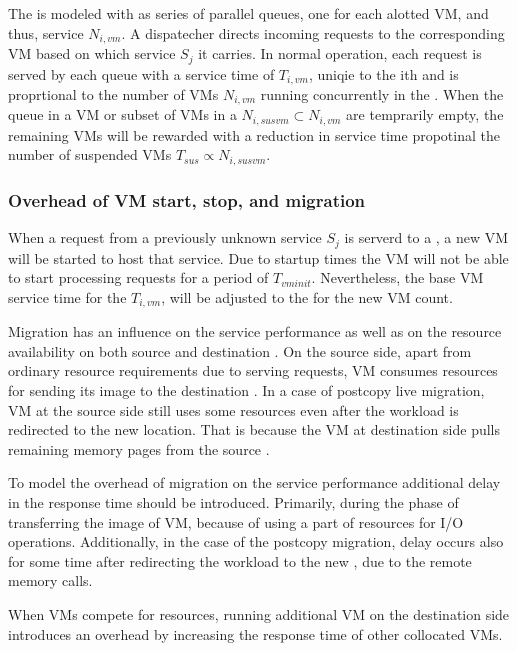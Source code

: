 The \dc{} is modeled with as series of parallel queues, one for each alotted VM, and thus, service $N_{i,vm}$. A dispatecher directs incoming requests to the corresponding VM based on which service $S_j$ it carries. In normal operation, each request is served by each queue with a service time of $T_{i,vm}$, uniqie to the ith \dc{} and is proprtional to the number of VMs $N_{i,vm}$ running concurrently in the \dc{}. When the queue in a VM or subset of VMs in a \dc{} $N_{i,sus vm} \subset N_{i,vm}$ are temprarily empty, the remaining VMs will be rewarded with a reduction in service time propotinal the number of suspended VMs $T_{sus} \propto N_{i,sus vm}$.

\subsubsection{Overhead of VM start, stop, and migration}
When a request from a previously unknown service $S_j$ is serverd to a \dc{}, a new VM will be started to host that service. Due to startup times the VM will not be able to start processing requests for a period of $T_{vm init}$. Nevertheless, the base VM service time for the \dc{} $T_{i,vm}$, will be adjusted to the for the new VM count.

Migration has an influence on the service performance as well as on the resource availability on both source and destination \dc{}.
On the source side, apart from ordinary resource requirements due to serving requests, VM consumes resources for sending its image to the destination \dc{}.
In a case of postcopy live migration, VM at the source side still uses some resources even after the workload is redirected to the new location.
That is because the VM at destination side pulls remaining memory pages from the source \dc{}.


To model the overhead of migration on the service performance additional delay in the response time should be introduced.
Primarily, during the phase of transferring the image of VM, because of using a part of resources for I/O operations.
Additionally, in the case of the postcopy migration, delay occurs also for some time after redirecting the workload to the new \dc{}, due to the remote memory calls.

When VMs compete for resources, running additional VM on the destination side introduces an overhead by increasing the response time of other collocated VMs.

